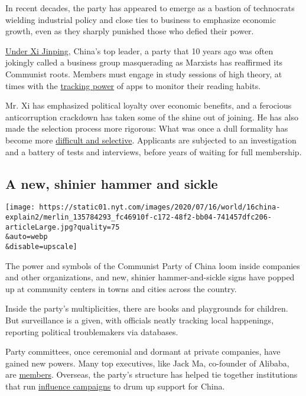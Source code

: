 In recent decades, the party has appeared to emerge as a bastion of
technocrats wielding industrial policy and close ties to business to
emphasize economic growth, even as they sharply punished those who
defied their power.

\href{https://www.nytimes.com/2017/10/24/world/asia/china-xi-jinping-constitution.html}{Under
Xi Jinping}, China's top leader, a party that 10 years ago was often
jokingly called a business group masquerading as Marxists has reaffirmed
its Communist roots. Members must engage in study sessions of high
theory, at times with the
\href{https://www.nytimes.com/2019/04/07/world/asia/china-xi-jinping-study-the-great-nation-app.html}{tracking
power} of apps to monitor their reading habits.

Mr. Xi has emphasized political loyalty over economic benefits, and a
ferocious anticorruption crackdown has taken some of the shine out of
joining. He has also made the selection process more rigorous: What was
once a dull formality has become more
\href{https://macropolo.org/analysis/members-only-recruitment-trends-in-the-chinese-communist-party/}{difficult
and selective}. Applicants are subjected to an investigation and a
battery of tests and interviews, before years of waiting for full
membership.

\hypertarget{a-new-shinier-hammer-and-sickle}{%
\subsection{A new, shinier hammer and
sickle}\label{a-new-shinier-hammer-and-sickle}}

\texttt{[image: https://static01.nyt.com/images/2020/07/16/world/16china-explain2/merlin\_135784293\_fc46910f-c172-48f2-bb04-741457dfc206-articleLarge.jpg?quality=75\\\&auto=webp\\\&disable=upscale]}

The power and symbols of the Communist Party of China loom inside
companies and other organizations, and new, shinier hammer-and-sickle
signs have popped up at community centers in towns and cities across the
country.

Inside the party's multiplicities, there are books and playgrounds for
children. But surveillance is a given, with officials neatly tracking
local happenings, reporting political troublemakers via databases.

Party committees, once ceremonial and dormant at private companies, have
gained new powers. Many top executives, like Jack Ma, co-founder of
Alibaba, are
\href{https://www.nytimes.com/2018/11/27/business/jack-ma-communist-party-alibaba.html}{members}.
Overseas, the party's structure has helped tie together institutions
that run
\href{https://www.nytimes.com/2019/05/20/world/australia/australia-china.html}{influence
campaigns} to drum up support for China.

